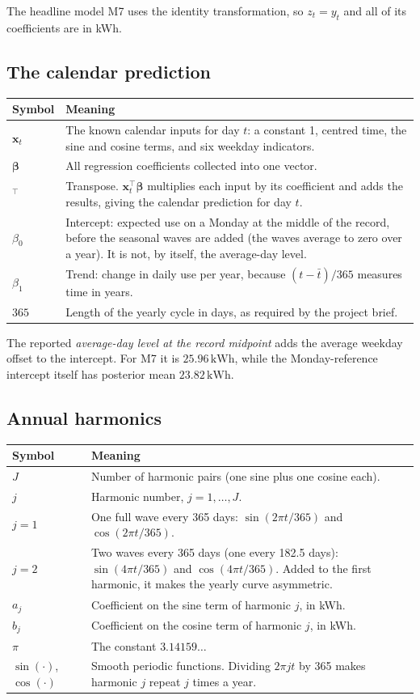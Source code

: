 \documentclass[11pt]{article}
\makeatletter
\newcommand{\kwh}{\,\mathrm{kWh}}
\newenvironment{reftable}[3]
  {\par\nopagebreak\addvspace{4pt}\noindent
   \renewcommand{\arraystretch}{1.3}%
   \begin{tabular}{@{}>{\raggedright\arraybackslash}p{#1\textwidth}
                      >{\raggedright\arraybackslash}p{\dimexpr0.97\textwidth-#1\textwidth-2\tabcolsep\relax}@{}}
   \toprule \textbf{#2} & \textbf{#3} \\ \midrule}
  {\bottomrule\end{tabular}\par\addvspace{8pt}}
\makeatother
\begin{document}
The headline model M7 uses the identity transformation, so $z_t = y_t$ and all
of its coefficients are in kWh.

\subsection{The calendar prediction}

\begin{reftable}{0.2}{Symbol}{Meaning}
$\mathbf{x}_t$ & The known calendar inputs for day $t$: a constant 1, centred time, the sine and cosine terms, and six weekday indicators. \\
$\boldsymbol\beta$ & All regression coefficients collected into one vector. \\
$^{\top}$ & Transpose. $\mathbf{x}_t^{\top}\boldsymbol\beta$ multiplies each input by its coefficient and adds the results, giving the calendar prediction for day $t$. \\
$\beta_0$ & Intercept: expected use on a Monday at the middle of the record, before the seasonal waves are added (the waves average to zero over a year). It is not, by itself, the average-day level. \\
$\beta_1$ & Trend: change in daily use per year, because $(t-\bar t)/365$ measures time in years. \\
$365$ & Length of the yearly cycle in days, as required by the project brief. \\
\end{reftable}

The reported \emph{average-day level at the record midpoint} adds the average
weekday offset to the intercept. For M7 it is $25.96\kwh$, while the
Monday-reference intercept itself has posterior mean $23.82\kwh$.

\subsection{Annual harmonics}

\begin{reftable}{0.2}{Symbol}{Meaning}
$J$ & Number of harmonic pairs (one sine plus one cosine each). \\
$j$ & Harmonic number, $j = 1, \ldots, J$. \\
$j = 1$ & One full wave every 365 days: $\sin(2\pi t/365)$ and $\cos(2\pi t/365)$. \\
$j = 2$ & Two waves every 365 days (one every 182.5 days): $\sin(4\pi t/365)$ and $\cos(4\pi t/365)$. Added to the first harmonic, it makes the yearly curve asymmetric. \\
$a_j$ & Coefficient on the sine term of harmonic $j$, in kWh. \\
$b_j$ & Coefficient on the cosine term of harmonic $j$, in kWh. \\
$\pi$ & The constant $3.14159\ldots$ \\
$\sin(\cdot)$,\ $\cos(\cdot)$ & Smooth periodic functions. Dividing $2\pi j t$ by 365 makes harmonic $j$ repeat $j$ times a year. \\
\end{reftable}
\end{document}
